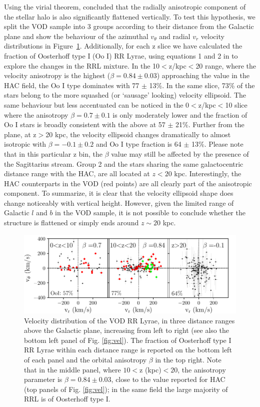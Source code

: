 \documentclass[fleqn,usenatbib]{mnras}
\begin{document}
Using the virial theorem, \citet{actionhalo} concluded that the
radially anisotropic component of the stellar halo is also
significantly flattened vertically. To test this hypothesis, we split
the VOD sample into 3 groups according to their distance from the
Galactic plane and show the behaviour of the azimuthal $v_{\theta}$
and radial $v_{r}$ velocity distributions in
Figure~\ref{fig:VOD_vel}. Additionally, for each z slice we have
calculated the fraction of Oosterhoff type I (Oo I) RR Lyrae, using
equations 1 and 2 in \citet{Be2018} to explore the changes in the RRL
mixture. In the 10$<$z/kpc$<$20 range, where the velocity anisotropy
is the highest ($\beta = 0.84 \pm 0.03$) approaching the value in the
HAC field, the Oo I type dominates with 77 $\pm$ 13\%. In the same
slice, 73\% of the stars belong to the more squashed (or `sausage'
looking) velocity ellipsoid. The same behaviour but less accentuated
can be noticed in the 0$<$z/kpc$<$10 slice where the anisotropy $\beta
= 0.7 \pm 0.1$ is only moderately lower and the fraction of Oo I stars
is broadly consistent with the above at 57 $\pm$ 21\%. Further from
the plane, at z$>$20 kpc, the velocity ellipsoid changes dramatically
to almost isotropic with $\beta = -0.1 \pm 0.2$ and Oo I type fraction
is 64 $\pm$ 13\%. Please note that in this particular z bin, the
$\beta$ value may still be affected by the presence of the Sagittarius
stream. Group 2 and the stars sharing the same galactocentric distance
range with the HAC, are all located at $z<20$ kpc. Interestingly, the
HAC counterparts in the VOD (red points) are all clearly part of the
anisotropic component. To summarize, it is clear that the velocity
ellipsoid shape does change noticeably with vertical height. However,
given the limited range of Galactic $l$ and $b$ in the VOD sample, it
is not possible to conclude whether the structure is flattened or
simply ends around $z\sim20$ kpc.
%   
%
\begin{figure}
	        \includegraphics[scale=0.55]{VOD_velocities_vphi_zcuts.pdf}
\vspace{-0.45cm}
   \caption{Velocity distribution of the VOD RR Lyrae, in three
     distance ranges above the Galactic plane, increasing from left to
     right (see also the bottom left panel of Fig.
     \ref{fig:vel}). The fraction of Oosterhoff type I RR Lyrae within
     each distance range is reported on the bottom left of each panel
     and the orbital anisotropy $\beta$ in the top right. Note that in
     the middle panel, where $10<$z (kpc)$<20$, the anisotropy
     parameter is $\beta=0.84\pm0.03$, close to the value reported for
     HAC (top panels of Fig.  \ref{fig:vel}); in the same field the
     large majority of RRL is of Oosterhoff type I.}
    \label{fig:VOD_vel}
\end{figure}
%
\end{document}
